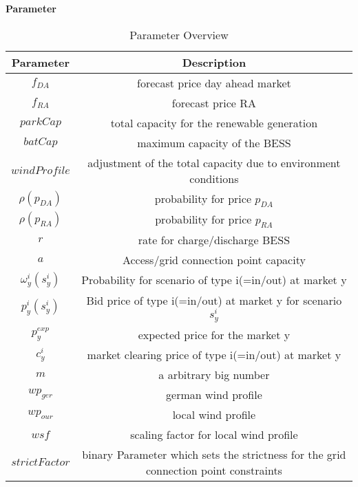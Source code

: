 \textbf{Parameter}
\begin{table}[H]
	\centering
	\begin{tabular}{c|c}
		\textbf{Parameter}      & \textbf{Description}                                                                 \\
		\hline
		$f_{DA}$                & forecast price day ahead market                                                      \\
		$f_{RA}$                & forecast price RA                                                                    \\
		$parkCap$               & total capacity for the renewable generation                                          \\
		$batCap$                & maximum capacity of the BESS                                                         \\
		$windProfile$           & adjustment of the total capacity due to environment conditions                       \\
		$\rho(p_{DA})$          & probability for price $p_{DA}$                                                       \\
		$\rho(p_{RA})$          & probability for price $p_{RA}$                                                       \\
		$r$                     & rate for charge/discharge BESS                                                       \\
		$a$                     & Access/grid connection point capacity                                                \\
		$\omega^i_{y}(s^i_{y})$ & Probability for scenario of type i(=in/out) at market y                              \\
		$p^i_{y}(s^i_y)$        & Bid price of type i(=in/out) at market y for scenario $s^i_y$                        \\
		$p^{exp}_{y}$           & expected price for the market y                                                      \\
		$c^i_y$                 & market clearing price of type i(=in/out) at market y                                 \\
		$m$                     & a arbitrary big number                                                               \\
		$wp_{ger}$              & german wind profile                                                                  \\
		$wp_{our}$              & local wind profile                                                                   \\
		$wsf$                   & scaling factor for local wind profile                                                \\
		$strictFactor$          & binary Parameter which sets the strictness for the grid connection point constraints \\
	\end{tabular}
	\caption{Parameter Overview}
	\label{tab:Parameter_Overview}
\end{table}





